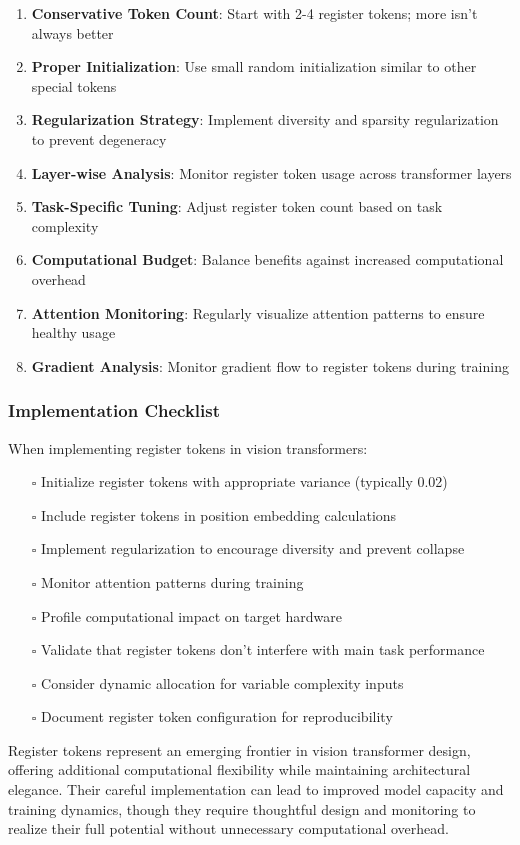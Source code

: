 \begin{enumerate}
\item \textbf{Conservative Token Count}: Start with 2-4 register tokens; more isn't always better
\item \textbf{Proper Initialization}: Use small random initialization similar to other special tokens
\item \textbf{Regularization Strategy}: Implement diversity and sparsity regularization to prevent degeneracy
\item \textbf{Layer-wise Analysis}: Monitor register token usage across transformer layers
\item \textbf{Task-Specific Tuning}: Adjust register token count based on task complexity
\item \textbf{Computational Budget}: Balance benefits against increased computational overhead
\item \textbf{Attention Monitoring}: Regularly visualize attention patterns to ensure healthy usage
\item \textbf{Gradient Analysis}: Monitor gradient flow to register tokens during training
\end{enumerate}

\subsubsection{Implementation Checklist}

When implementing register tokens in vision transformers:

\begin{itemize}
\item[$\square$] Initialize register tokens with appropriate variance (typically 0.02)
\item[$\square$] Include register tokens in position embedding calculations
\item[$\square$] Implement regularization to encourage diversity and prevent collapse
\item[$\square$] Monitor attention patterns during training
\item[$\square$] Profile computational impact on target hardware
\item[$\square$] Validate that register tokens don't interfere with main task performance
\item[$\square$] Consider dynamic allocation for variable complexity inputs
\item[$\square$] Document register token configuration for reproducibility
\end{itemize}

Register tokens represent an emerging frontier in vision transformer design, offering additional computational flexibility while maintaining architectural elegance. Their careful implementation can lead to improved model capacity and training dynamics, though they require thoughtful design and monitoring to realize their full potential without unnecessary computational overhead.
